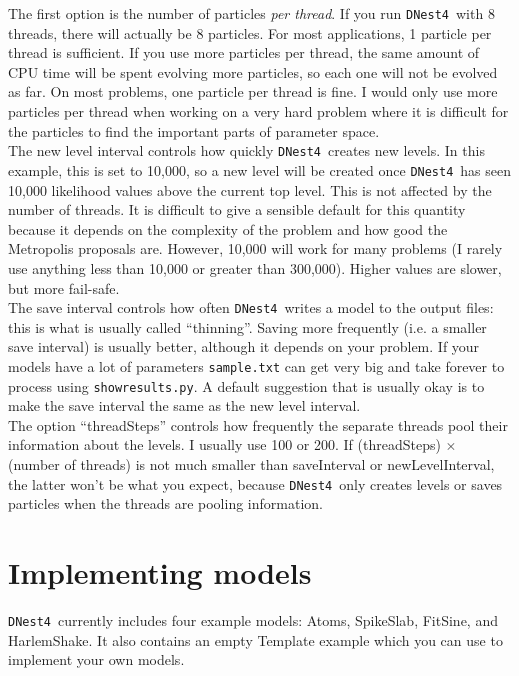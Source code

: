 \documentclass[a4paper, 11pt]{article}
\newcommand{\dnest}{{\tt DNest4}}
\begin{document}
The first option is the number of particles {\it per thread}. If you run
\dnest~with 8 threads, there will actually be 8 particles. For most
applications, 1 particle per thread is sufficient. If you use more particles
per thread, the same amount of CPU time will be spent evolving more particles,
so each one will not be evolved as far. On most problems, one particle per
thread is fine. I would only use more particles per thread when working on
a very hard problem where it is difficult for the particles to find the
important parts of parameter space.\\

The new level interval controls how quickly \dnest~creates new levels. In this
example, this is set to 10,000, so a new level will be created once \dnest~has
seen 10,000 likelihood values above the current top level. This is not affected by
the number of threads. It is difficult to give a sensible default for this
quantity because it depends on the complexity of the problem and how good
the Metropolis proposals are. However, 10,000
will work for many problems (I rarely use anything less than 10,000 or greater
than 300,000). Higher values are slower, but more fail-safe.\\

The save interval controls how often \dnest~writes a model to the output
files: this is what is usually called ``thinning''. Saving more frequently
(i.e. a smaller save interval) is usually better, although it depends on your
problem. If your models have a lot of parameters {\tt sample.txt} can get
very big and take forever to process using {\tt showresults.py}. A default
suggestion that is usually okay is to make the save interval the same as the
new level interval.\\

The option ``threadSteps'' controls how frequently the separate threads pool
their information about the levels. I usually use 100 or 200. If
(threadSteps) $\times$ (number of threads) is not much smaller than
saveInterval or newLevelInterval, the latter won't be what you expect, because
\dnest~only creates levels or saves particles when the threads are pooling
information.\\

\section{Implementing models}
\dnest~currently includes four example models: Atoms, SpikeSlab, FitSine, and
HarlemShake. It also contains an empty Template example which you can use
to implement your own models.\\
\end{document}
